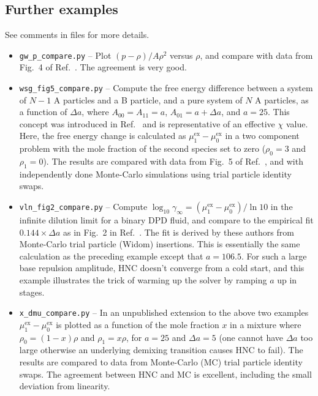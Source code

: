 \documentclass[12pt,a4paper]{article}
\newcommand{\myex}{^{\mathrm{ex}}}
\newcommand{\muex}{\mu\myex}
\newcommand{\Refcite}[1]{Ref.~\cite{#1}}
\begin{document}

\subsection{Further examples}

See comments in files for more details.

\begin{itemize}
%
\item\verb+gw_p_compare.py+ -- Plot $(p-\rho) /A\rho^2$ versus $\rho$,
  and compare with data from Fig.~4 of \Refcite{GW97}.  The agreement
  is very good.
%
\item\verb+wsg_fig5_compare.py+ -- Compute the free energy difference
  between a system of $N-1$ A particles and a B particle, and a pure
  system of $N$ A particles, as a function of $\Delta a$, where
  $A_{00}=A_{11}=a$, $A_{01}=a+\Delta a$, and $a=25$.  This concept
  was introduced in \Refcite{WSG01} and is representative of an
  effective $\chi$ value.  Here, the free energy change is calculated
  as $\muex_1-\muex_0$ in a two component problem with the mole
  fraction of the second species set to zero ($\rho_0=3$ and
  $\rho_1=0$).  The results are compared with data from Fig.~5 of
  \Refcite{WSG01}, and with independently done Monte-Carlo simulations
  using trial particle identity swaps.
%
\item\verb+vln_fig2_compare.py+ -- Compute $\log_{10}\gamma_\infty =
  (\muex_1 - \muex_0) / \ln 10$ in the infinite dilution limit for a
  binary DPD fluid, and compare to the empirical fit $0.144 \times
  \Delta a$ as in Fig.~2 in \Refcite{VLN13}.  The fit is derived by
  these authors from Monte-Carlo trial particle (Widom) insertions.
  This is essentially the same calculation as the preceding example
  except that $a=106.5$.  For such a large base repulsion amplitude,
  HNC doesn't converge from a cold start, and this example illustrates
  the trick of warming up the solver by ramping $a$ up in stages.
%
\item\verb+x_dmu_compare.py+ -- In an unpublished extension to the
  above two examples $\muex_1-\muex_0$ is plotted as a function of the
  mole fraction $x$ in a mixture where $\rho_0=(1-x)\rho$ and
  $\rho_1=x\rho$, for $a=25$ and $\Delta a=5$ (one cannot have $\Delta
  a$ too large otherwise an underlying demixing transition causes HNC
  to fail).  The results are compared to data from Monte-Carlo (MC)
  trial particle identity swaps.  The agreement between HNC
  and MC is excellent, including the small deviation from linearity.

\end{itemize}
\end{document}
